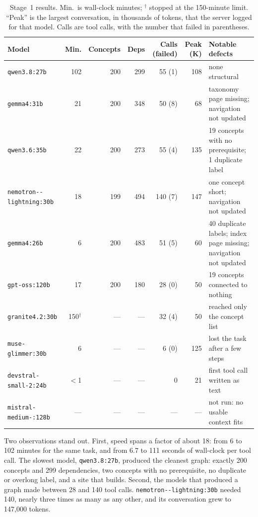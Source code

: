 \documentclass[11pt]{article}
\newcommand{\mdl}[1]{\texttt{#1}}
\newcommand{\Qeight}{\mdl{qwen3.8:27b}}
\newcommand{\Gthirtyone}{\mdl{gemma4:31b}}
\newcommand{\Muse}{\mdl{muse-\allowbreak glimmer:30b}}
\newcommand{\Qsix}{\mdl{qwen3.6:35b}}
\newcommand{\Gtwentysix}{\mdl{gemma4:26b}}
\newcommand{\Nemo}{\mdl{nemotron-\allowbreak 3.5-\allowbreak lightning:30b}}
\newcommand{\Mistral}{\mdl{mistral-\allowbreak medium-\allowbreak 3.5:128b}}
\newcommand{\Gptoss}{\mdl{gpt-oss:120b}}
\newcommand{\Devstral}{\mdl{devstral-\allowbreak small-2:24b}}
\newcommand{\Granite}{\mdl{granite4.2:30b}}
\begin{document}
\begin{table}[htbp]
\centering
\footnotesize
{\setlength{\tabcolsep}{4pt}\begin{tabular}{@{}p{3.0cm}rrrrrp{4.7cm}@{}}
\toprule
\textbf{Model} & \textbf{Min.} & \textbf{Concepts} & \textbf{Deps} & \textbf{Calls (failed)} & \textbf{Peak (K)} & \textbf{Notable defects} \\
\midrule
\Qeight & 102 & 200 & 299 & 55 (1) & 108 & none structural \\
\Gthirtyone & 21 & 200 & 348 & 50 (8) & 68 & taxonomy page missing; navigation not updated \\
\Qsix & 22 & 200 & 273 & 55 (4) & 135 & 19 concepts with no prerequisite; 1 duplicate label \\
\Nemo & 18 & 199 & 494 & 140 (7) & 147 & one concept short; navigation not updated \\
\Gtwentysix & 6 & 200 & 483 & 51 (5) & 60 & 40 duplicate labels; index page missing; navigation not updated \\
\Gptoss & 17 & 200 & 180 & 28 (0) & 50 & 19 concepts connected to nothing \\
\midrule
\Granite & 150$^{\dagger}$ & --- & --- & 32 (4) & 50 & reached only the concept list \\
\Muse & 6 & --- & --- & 6 (0) & 125 & lost the task after a few steps \\
\Devstral & $<$1 & --- & --- & 0 & 21 & first tool call written as text \\
\Mistral & --- & --- & --- & --- & --- & not run: no usable context fits \\
\bottomrule
\end{tabular}}
\caption{Stage~1 results. Min.\ is wall-clock minutes; $^{\dagger}$ stopped at the 150-minute limit. ``Peak'' is the largest conversation, in thousands of tokens, that the server logged for that model. Calls are tool calls, with the number that failed in parentheses.}
\label{tab:stage1}
\end{table}

Two observations stand out. First, speed spans a factor of about 18: from 6 to 102 minutes for the same task, and from 6.7 to 111 seconds of wall-clock per tool call. The slowest model, \Qeight, produced the cleanest graph: exactly 200 concepts and 299 dependencies, two concepts with no prerequisite, no duplicate or overlong label, and a site that builds. Second, the models that produced a graph made between 28 and 140 tool calls. \Nemo{} needed 140, nearly three times as many as any other, and its conversation grew to 147,000 tokens.
\end{document}

